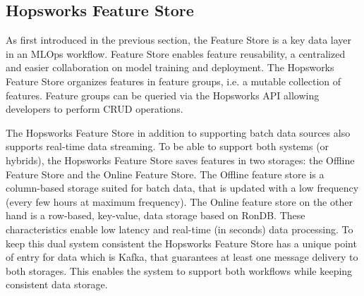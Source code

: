 \subsection{Hopsworks Feature Store}

As first introduced in the previous section, the Feature Store is a key data layer in an \gls{MLOps} workflow. Feature Store enables feature reusability, a centralized and easier collaboration on model training and deployment. The Hopsworks Feature Store organizes features in feature groups, i.e. a mutable collection of features. Feature groups can be queried via the Hopsworks \gls{API} allowing developers to perform \gls{CRUD} operations.

The Hopsworks Feature Store in addition to supporting batch data sources also supports real-time data streaming. To be able to support both systems (or hybrids), the Hopsworks Feature Store saves features in two storages: the Offline Feature Store and the Online Feature Store. The Offline feature store is a column-based storage suited for batch data, that is updated with a low frequency (every few hours at maximum frequency). The Online feature store on the other hand is a row-based, key-value, data storage based on RonDB. These characteristics enable low latency and real-time (in seconds) data processing. To keep this dual system consistent the Hopsworks Feature Store has a unique point of entry for data which is Kafka, that guarantees at least one message delivery to both storages. This enables the system to support both workflows while keeping consistent data storage.